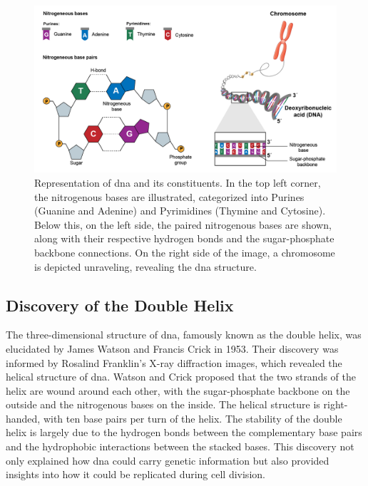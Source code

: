 \begin{figure}[H]
    \centering
    \includegraphics[width=1\textwidth]{figs/dna.png}
    \caption{Representation of \ac{dna} and its constituents. In the top left corner, the nitrogenous bases are illustrated, categorized into Purines (Guanine and Adenine) and Pyrimidines (Thymine and Cytosine). Below this, on the left side, the paired nitrogenous bases are shown, along with their respective hydrogen bonds and the sugar-phosphate backbone connections. On the right side of the image, a chromosome is depicted unraveling, revealing the \ac{dna} structure. \cite{DNA}} 
    \label{fig:dna}
\end{figure}

\subsection{Discovery of the Double Helix} \label{subsec:genetics_discovery}

The three-dimensional structure of \ac{dna}, famously known as the double helix, was elucidated by James Watson and Francis Crick in 1953. Their discovery was informed by Rosalind Franklin’s X-ray diffraction images, which revealed the helical structure of \ac{dna}. Watson and Crick proposed that the two strands of the helix are wound around each other, with the sugar-phosphate backbone on the outside and the nitrogenous bases on the inside. The helical structure is right-handed, with ten base pairs per turn of the helix. The stability of the double helix is largely due to the hydrogen bonds between the complementary base pairs and the hydrophobic interactions between the stacked bases. This discovery not only explained how \ac{dna} could carry genetic information but also provided insights into how it could be replicated during cell division. \cite{Minchin2019}

